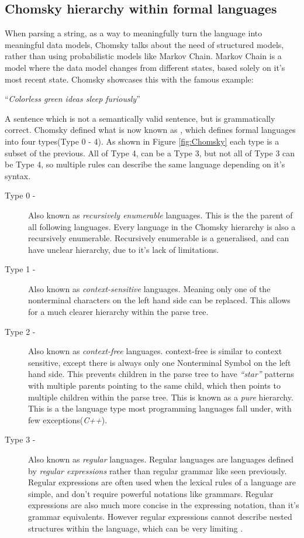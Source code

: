 \newpage
\subsection{Chomsky hierarchy within formal languages}
When parsing a string, as a way to meaningfully turn the language into meaningful data models, Chomsky talks about the need of structured models, rather than using probabilistic models like Markov Chain\cite{Chomsky}. Markov Chain is a model where the data model changes from different states, based solely on it's most recent state. Chomsky showcases this with the famous example:

\vspace{12pt}
\centerline{``\textit{Colorless green ideas sleep furiously}''}
\vspace{12pt}

A sentence which is not a semantically valid sentence, but is grammatically correct. Chomsky defined what is now known as \textit{\hierarchy{}}, which defines formal languages into four types(Type 0 - 4)\cite{Chomsky}. As shown in Figure \ref{fig:Chomsky} each type is a subset of the previous. All of Type 4, can be a Type 3, but not all of Type 3 can be Type 4, so multiple rules can describe the same language depending on it's syntax.
\begin{description}
    \item[Type 0 -] Also known as \textit{recursively enumerable} languages. This is the the parent of all following languages. Every language in the Chomsky hierarchy is also a recursively enumerable. Recursively enumerable is a generalised, and can have unclear hierarchy, due to it's lack of limitations.
    \newpage
    \item[Type 1 -] Also known as \textit{context-sensitive} languages. Meaning only one of the nonterminal characters on the left hand side can be replaced. This allows for a much clearer hierarchy within the parse tree.
    \item[Type 2 -] Also known as \textit{context-free} languages. context-free is similar to context sensitive, except there is always only one Nonterminal Symbol on the left hand side. This prevents children in the parse tree to have \textit{``star''} patterns with multiple parents pointing to the same child, which then points to multiple children within the parse tree. This is known as a \textit{pure} hierarchy. This is a the language type most programming languages fall under, with few exceptions(\textit{C++}).
    \item[Type 3 -]  Also known as \textit{regular} languages. Regular languages are languages defined by \textit{regular expressions} rather than regular grammar like seen previously. Regular expressions are often used when the lexical rules of a language are simple, and don't require powerful notations like grammars. Regular expressions are also much more concise in the expressing notation, than it's grammar equivalents. However regular expressions cannot describe nested structures within the language, which can be very limiting \cite{DragonBook}.
\end{description}
